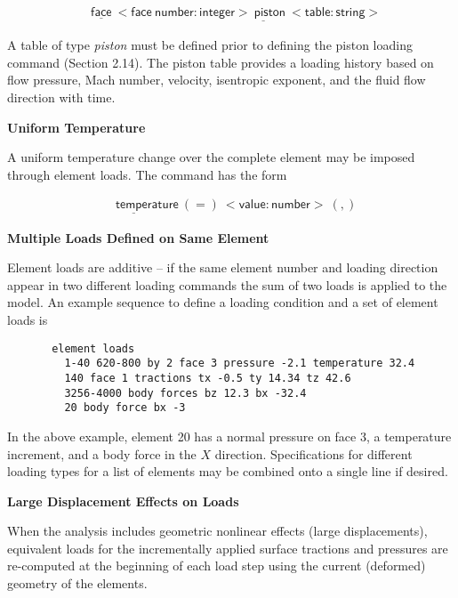 \documentclass[11pt]{report}
\numberwithin{equation}{section}
\newcommand{\nf} {\normalsize}
\newcommand{\ul} {\underline}
\newcommand{\hv} {\mathsf}   %
\newcommand{\ti}{\emph}
\newcommand{\noi}{\noindent}
\begin{document}
\small
\begin{align*}
&\hv{\ul{face}\ <face\ number:integer>\ \ul{pist}on\ <table:string> }
\end{align*} 
\nf

\noindent A table of type \ti{piston} must be defined prior to 
defining the piston loading command (Section 2.14). The piston table provides a 
loading history based on flow pressure, Mach number, velocity, 
isentropic exponent, and the fluid flow direction with time. 

\noi \textbf{Uniform Temperature}

\noi A uniform temperature change over the complete element may be imposed through
element loads. The command has the form

\small
\begin{align*}
&\hv{\ul{temper}ature\ (=)\ <value:number>\ (,) }
\end{align*} 
\nf

\noi \textbf{Multiple Loads Defined on Same Element}

\noi Element loads are additive -- if the same element number and loading 
direction appear in two different loading commands the sum of 
two loads is applied to the model. An example sequence 
to define a loading condition and a set of element loads is

\small \begin{verbatim}
       element loads
         1-40 620-800 by 2 face 3 pressure -2.1 temperature 32.4
         140 face 1 tractions tx -0.5 ty 14.34 tz 42.6
         3256-4000 body forces bz 12.3 bx -32.4
         20 body force bx -3
\end{verbatim}\nf

\noindent In the above example, element 20 has a normal 
pressure on face 3, a temperature increment,
and a body force in the $X$ direction. 
Specifications for different loading types for a list of elements 
may be combined onto a single line if desired.

\noi \textbf{Large Displacement Effects on Loads}

\noi When the analysis includes geometric nonlinear effects 
(large displacements), equivalent loads for the incrementally 
applied surface tractions and pressures are re-computed at the beginning 
of each load step using the current (deformed) geometry of the elements.
\end{document}
